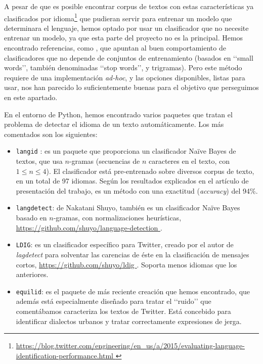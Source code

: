 A pesar de que es posible encontrar corpus de textos con estas características 
ya clasificados por 
idioma\footnote{\url{https://blog.twitter.com/engineering/en_us/a/2015/evaluating-language-identification-performance.html }}
que pudieran servir para entrenar un modelo que determinara el lenguaje,
hemos optado por usar un clasificador que no necesite entrenar un modelo, 
ya que esta parte del proyecto no es la principal. Hemos encontrado
referencias, como \cite{almeida_estevez_piad}, que apuntan al buen comportamiento de 
clasificadores que no depende de conjuntos de entrenamiento (basados en \lq\lq small words\rq\rq,
también denominadas \lq\lq stop words\rq\rq, y trigramas). Pero este método requiere de una implementación
{\em ad-hoc}, y las opciones disponibles, listas para usar, nos han parecido lo suficientemente
buenas para el objetivo que perseguimos en este apartado.


En el entorno de Python, hemos encontrado varios paquetes que tratan el 
problema de detectar el idioma de un texto automáticamente. Los más
comentados son los siguientes:
\begin{itemize} 
\item {\tt langid} \cite{langid}: es un paquete que proporciona un 
clasificador Naïve Bayes de textos, que usa $n$-gramas (secuencias de $n$ caracteres en el texto, con $1\leq n\leq 4$). 
El clasificador está pre-entrenado sobre diversos corpus de texto, en un total de 97 idiomas. Según los
resultados explicados en el artículo de presentación del trabajo, es un método con una
exactitud ({\em accuracy}) del 94\%.
\item {\tt langdetect}: de Nakatani Shuyo, también es un clasificador Naïve Bayes basado en $n$-gramas, con
normalizaciones heurísticas, \url{https://github.com/shuyo/language-detection }.
\item {\tt LDIG}: es un clasificador específico para Twitter, creado por el autor
de {\em lagdetect} para solventar las carencias de éste en la clasificación de mensajes
cortos, \url{https://github.com/shuyo/ldig }. Soporta menos idiomas que los anteriores.
\item {\tt equilid}: es el paquete de más reciente creación que hemos encontrado,
que además está especialmente diseñado para tratar el \lq\lq ruido\rq\rq
que comentábamos caracteriza los textos de Twitter. Está concebido para identificar
dialectos urbanos y tratar correctamente expresiones de jerga.
\end{itemize}

